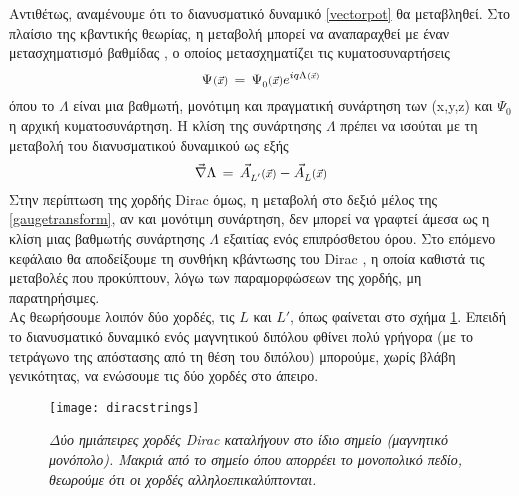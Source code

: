 Αντιθέτως, αναμένουμε ότι το διανυσματικό δυναμικό  \eqref{vectorpot} θα μεταβληθεί. Στο πλαίσιο της κβαντικής θεωρίας, η μεταβολή μπορεί να αναπαραχθεί με έναν μετασχηματισμό βαθμίδας \cite{Sakurai:1167961}, ο οποίος μετασχηματίζει τις κυματοσυναρτήσεις
\begin{equation}\label{gtfun}
    \scafun{\Psi}{\vec{x}} \,=\, \scafun[0]{\Psi}{\vec{x}}e^{iq \scafun{\Lambda}{\vec{x}}}
\end{equation}
όπου το $\Lambda$ είναι μια βαθμωτή, μονότιμη και πραγματική συνάρτηση των (x,y,z) και $\Psi_0$ η αρχική κυματοσυνάρτηση. Η κλίση της συνάρτησης $\Lambda$ 
πρέπει να ισούται με τη μεταβολή του διανυσματικού δυναμικού ως εξής
\begin{equation}\label{gaugetransform}
    \vec{\nabla} \Lambda \,=\, \vecfun[L']{A}{\vec{x}} - \vecfun[L]{A}{\vec{x}}
\end{equation}
Στην περίπτωση της χορδής Dirac όμως, η μεταβολή στο δεξιό μέλος της \eqref{gaugetransform}, αν και μονότιμη συνάρτηση, δεν μπορεί να γραφτεί άμεσα ως η κλίση μιας βαθμωτής συνάρτησης $\Lambda$ εξαιτίας ενός επιπρόσθετου όρου. Στο επόμενο κεφάλαιο θα αποδείξουμε τη συνθήκη κβάντωσης 
του Dirac \cite{Dirac:1931kp}, η οποία καθιστά τις μεταβολές που προκύπτουν, λόγω των παραμορφώσεων της χορδής, μη 
παρατηρήσιμες.\\

Ας θεωρήσουμε λοιπόν δύο χορδές, τις $L$ και $L'$, όπως φαίνεται στο σχήμα \ref{fig:twostrconf}. Επειδή το διανυσματικό δυναμικό ενός μαγνητικού διπόλου
φθίνει πολύ γρήγορα (με το τετράγωνο της απόστασης από τη θέση του διπόλου)
μπορούμε, χωρίς βλάβη γενικότητας, να ενώσουμε τις δύο χορδές στο άπειρο. \\

\begin{figure}[t]
    \centering
    \texttt{[image: diracstrings]}
    \caption{\textit{Δύο ημιάπειρες χορδές Dirac καταλήγουν στο ίδιο σημείο (μαγνητικό μονόπολο). Μακριά από το σημείο όπου απορρέει το μονοπολικό πεδίο, θεωρούμε ότι οι χορδές αλληλοεπικαλύπτονται.}}
    \label{fig:twostrconf}
\end{figure}

